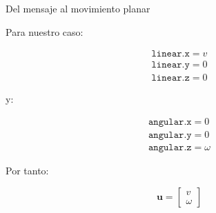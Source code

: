 \documentclass[aspectratio=169]{beamer}
\begin{document}
\begin{frame}{Del mensaje al movimiento planar}

    Para nuestro caso:

    \[
        \begin{matrix}
        \texttt{linear.x}=v \\
        \texttt{linear.y}=0\\
        \texttt{linear.z}=0
    \end{matrix}
    \]


    y:

    \[
        \begin{matrix}
    \texttt{angular.x}=0\\
    \texttt{angular.y}=0\\
    \texttt{angular.z}=\omega
    \end{matrix}
    \]

    Por tanto:

    \[
    \boxed{
        \mathbf{u}
        =
        \begin{bmatrix}
            v\\
            \omega
        \end{bmatrix}
    }
    \]

\end{frame}
\end{document}
